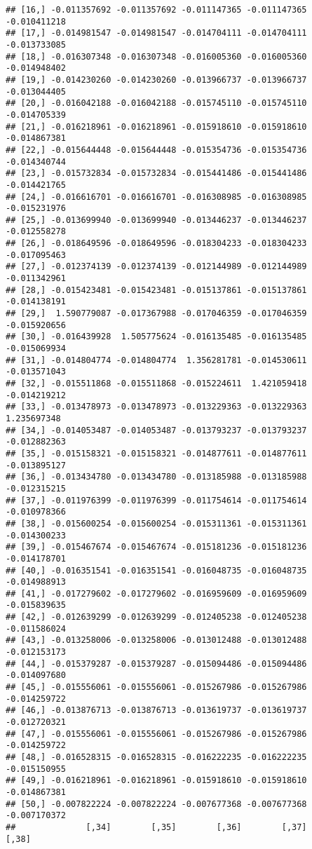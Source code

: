 \documentclass[
]{article}
\begin{document}
\begin{verbatim}
## [16,] -0.011357692 -0.011357692 -0.011147365 -0.011147365 -0.010411218
## [17,] -0.014981547 -0.014981547 -0.014704111 -0.014704111 -0.013733085
## [18,] -0.016307348 -0.016307348 -0.016005360 -0.016005360 -0.014948402
## [19,] -0.014230260 -0.014230260 -0.013966737 -0.013966737 -0.013044405
## [20,] -0.016042188 -0.016042188 -0.015745110 -0.015745110 -0.014705339
## [21,] -0.016218961 -0.016218961 -0.015918610 -0.015918610 -0.014867381
## [22,] -0.015644448 -0.015644448 -0.015354736 -0.015354736 -0.014340744
## [23,] -0.015732834 -0.015732834 -0.015441486 -0.015441486 -0.014421765
## [24,] -0.016616701 -0.016616701 -0.016308985 -0.016308985 -0.015231976
## [25,] -0.013699940 -0.013699940 -0.013446237 -0.013446237 -0.012558278
## [26,] -0.018649596 -0.018649596 -0.018304233 -0.018304233 -0.017095463
## [27,] -0.012374139 -0.012374139 -0.012144989 -0.012144989 -0.011342961
## [28,] -0.015423481 -0.015423481 -0.015137861 -0.015137861 -0.014138191
## [29,]  1.590779087 -0.017367988 -0.017046359 -0.017046359 -0.015920656
## [30,] -0.016439928  1.505775624 -0.016135485 -0.016135485 -0.015069934
## [31,] -0.014804774 -0.014804774  1.356281781 -0.014530611 -0.013571043
## [32,] -0.015511868 -0.015511868 -0.015224611  1.421059418 -0.014219212
## [33,] -0.013478973 -0.013478973 -0.013229363 -0.013229363  1.235697348
## [34,] -0.014053487 -0.014053487 -0.013793237 -0.013793237 -0.012882363
## [35,] -0.015158321 -0.015158321 -0.014877611 -0.014877611 -0.013895127
## [36,] -0.013434780 -0.013434780 -0.013185988 -0.013185988 -0.012315215
## [37,] -0.011976399 -0.011976399 -0.011754614 -0.011754614 -0.010978366
## [38,] -0.015600254 -0.015600254 -0.015311361 -0.015311361 -0.014300233
## [39,] -0.015467674 -0.015467674 -0.015181236 -0.015181236 -0.014178701
## [40,] -0.016351541 -0.016351541 -0.016048735 -0.016048735 -0.014988913
## [41,] -0.017279602 -0.017279602 -0.016959609 -0.016959609 -0.015839635
## [42,] -0.012639299 -0.012639299 -0.012405238 -0.012405238 -0.011586024
## [43,] -0.013258006 -0.013258006 -0.013012488 -0.013012488 -0.012153173
## [44,] -0.015379287 -0.015379287 -0.015094486 -0.015094486 -0.014097680
## [45,] -0.015556061 -0.015556061 -0.015267986 -0.015267986 -0.014259722
## [46,] -0.013876713 -0.013876713 -0.013619737 -0.013619737 -0.012720321
## [47,] -0.015556061 -0.015556061 -0.015267986 -0.015267986 -0.014259722
## [48,] -0.016528315 -0.016528315 -0.016222235 -0.016222235 -0.015150955
## [49,] -0.016218961 -0.016218961 -0.015918610 -0.015918610 -0.014867381
## [50,] -0.007822224 -0.007822224 -0.007677368 -0.007677368 -0.007170372
##              [,34]        [,35]        [,36]        [,37]        [,38]

\end{verbatim}
\end{document}
